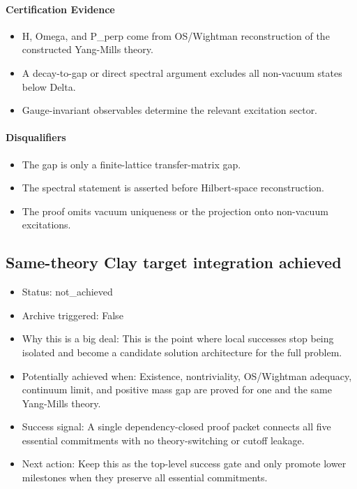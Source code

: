 \documentclass[11pt]{article}
\begin{document}
\paragraph{Certification Evidence}

\begin{itemize}
\item H, Omega, and P\_perp come from OS/Wightman reconstruction of the constructed Yang-Mills theory.
\item A decay-to-gap or direct spectral argument excludes all non-vacuum states below Delta.
\item Gauge-invariant observables determine the relevant excitation sector.
\end{itemize}

\paragraph{Disqualifiers}

\begin{itemize}
\item The gap is only a finite-lattice transfer-matrix gap.
\item The spectral statement is asserted before Hilbert-space reconstruction.
\item The proof omits vacuum uniqueness or the projection onto non-vacuum excitations.
\end{itemize}

\subsection*{Same-theory Clay target integration achieved}

\begin{itemize}
\item Status: not\_achieved
\item Archive triggered: False
\item Why this is a big deal: This is the point where local successes stop being isolated and become a candidate solution architecture for the full problem.
\item Potentially achieved when: Existence, nontriviality, OS/Wightman adequacy, continuum limit, and positive mass gap are proved for one and the same Yang-Mills theory.
\item Success signal: A single dependency-closed proof packet connects all five essential commitments with no theory-switching or cutoff leakage.
\item Next action: Keep this as the top-level success gate and only promote lower milestones when they preserve all essential commitments.
\end{itemize}
\end{document}
